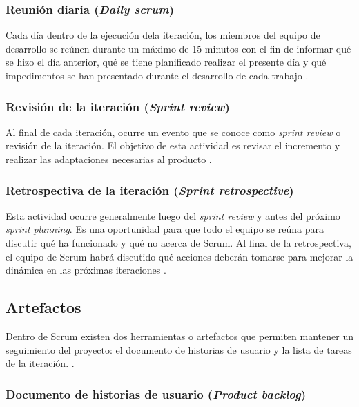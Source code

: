\subsubsection{Reunión diaria (\textit{Daily scrum})}

Cada día dentro de la ejecución dela iteración, los miembros del equipo de desarrollo se reúnen durante un máximo de 15 minutos con el fin de informar qué se hizo el día anterior, qué se tiene planificado realizar el presente día y qué impedimentos se han presentado durante el desarrollo de cada trabajo \cite{SCRM12}.

\subsubsection{Revisión de la iteración (\textit{Sprint review})}

Al final de cada iteración, ocurre un evento que se conoce como \textit{sprint review} o revisión de la iteración. El objetivo de esta actividad es revisar el incremento y realizar las adaptaciones necesarias al producto \cite{SCRM12}.

\subsubsection{Retrospectiva de la iteración (\textit{Sprint retrospective})}

Esta actividad ocurre generalmente luego del \textit{sprint review} y antes del próximo \textit{sprint planning}. Es una oportunidad para que todo el equipo se reúna para discutir qué ha funcionado y qué no acerca de Scrum. Al final de la retrospectiva, el equipo de Scrum habrá discutido qué acciones deberán tomarse para mejorar la dinámica en las próximas iteraciones \cite{SCRM2}. 

\subsection{Artefactos}

Dentro de Scrum existen dos herramientas o artefactos que permiten mantener un seguimiento del proyecto: el documento de historias de usuario y la lista de tareas de la iteración. \cite{SCRM2}.

\subsubsection{Documento de historias de usuario (\textit{Product backlog})}


